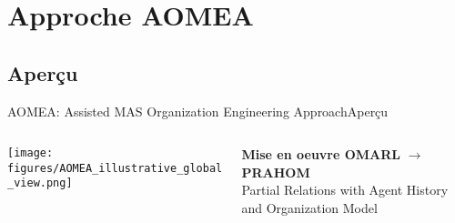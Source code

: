 

\section{Approche AOMEA}

\subsection{Aperçu}

\begin{frame}{AOMEA: Assisted MAS Organization Engineering Approach}{Aperçu}

    \begin{columns}

        \begin{column}{0.5\textwidth}

            \centering
            \texttt{[image: figures/AOMEA\_illustrative\_global\_view.png]}

        \end{column}

        \begin{column}{0.5\textwidth}
            {\small \textbf{Mise en oeuvre OMARL} $\rightarrow$ \textbf{PRAHOM} \\ { \footnotesize Partial Relations with Agent History and Organization Model}}


        \end{column}

    \end{columns}

\end{frame}



